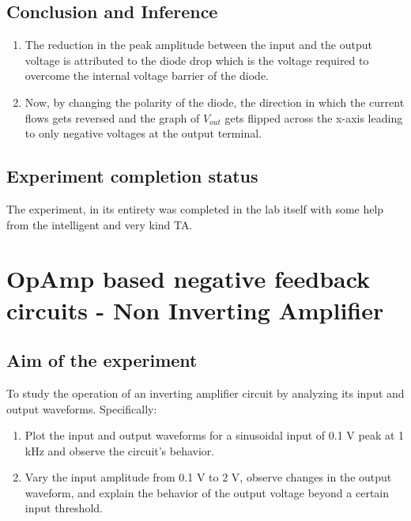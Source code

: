 \documentclass[12pt]{article}
\begin{document}
\subsection{Conclusion and Inference}
\begin{enumerate}
\item The reduction in the peak amplitude between the input and the output voltage is attributed to the diode drop which is the voltage required to overcome the internal voltage barrier of the diode. 
\item Now, by changing the polarity of the diode, the direction in which the current flows gets reversed and the graph of \(V_{out}\) gets flipped across the x-axis leading to only negative voltages at the output terminal.
\end{enumerate}
\subsection{Experiment completion status}
The experiment, in its entirety was completed in the lab itself with some help from the intelligent and very kind TA.


\newpage
\section{OpAmp based negative feedback circuits - Non Inverting Amplifier}
\subsection{Aim of the experiment}
To study the operation of an inverting amplifier circuit by analyzing its input and output waveforms. Specifically:

\begin{enumerate}
\item Plot the input and output waveforms for a sinusoidal input of 0.1 V peak at 1 kHz and observe the circuit's behavior.
\item Vary the input amplitude from 0.1 V to 2 V, observe changes in the output waveform, and explain the behavior of the output voltage beyond a certain input threshold.
\end{enumerate}
\end{document}
